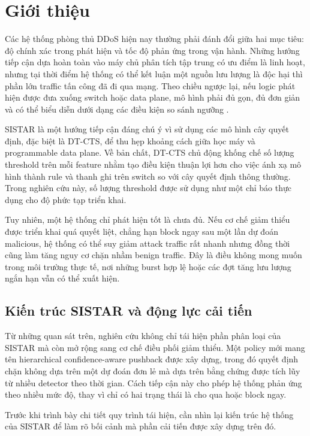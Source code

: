 \section{Giới thiệu}

Các hệ thống phòng thủ DDoS hiện nay thường phải đánh đổi giữa hai mục tiêu: độ chính xác trong phát hiện và tốc độ phản ứng trong vận hành. Những hướng tiếp cận dựa hoàn toàn vào máy chủ phân tích tập trung có ưu điểm là linh hoạt, nhưng tại thời điểm hệ thống có thể kết luận một nguồn lưu lượng là độc hại thì phần lớn traffic tấn công đã đi qua mạng. Theo chiều ngược lại, nếu logic phát hiện được đưa xuống switch hoặc data plane, mô hình phải đủ gọn, đủ đơn giản và có thể biểu diễn dưới dạng các điều kiện so sánh ngưỡng \cite{bosshart2014p4,breiman2001random}.

SISTAR là một hướng tiếp cận đáng chú ý vì sử dụng các mô hình cây quyết định, đặc biệt là DT-CTS, để thu hẹp khoảng cách giữa học máy và programmable data plane. Về bản chất, DT-CTS chủ động khống chế số lượng threshold trên mỗi feature nhằm tạo điều kiện thuận lợi hơn cho việc ánh xạ mô hình thành rule và thanh ghi trên switch so với cây quyết định thông thường. Trong nghiên cứu này, số lượng threshold được sử dụng như một chỉ báo thực dụng cho độ phức tạp triển khai.

Tuy nhiên, một hệ thống chỉ phát hiện tốt là chưa đủ. Nếu cơ chế giảm thiểu được triển khai quá quyết liệt, chẳng hạn block ngay sau một lần dự đoán malicious, hệ thống có thể suy giảm attack traffic rất nhanh nhưng đồng thời cũng làm tăng nguy cơ chặn nhầm benign traffic. Đây là điều không mong muốn trong môi trường thực tế, nơi những burst hợp lệ hoặc các đợt tăng lưu lượng ngắn hạn vẫn có thể xuất hiện.

\subsection{Kiến trúc SISTAR và động lực cải tiến}

Từ những quan sát trên, nghiên cứu không chỉ tái hiện phần phân loại của SISTAR mà còn mở rộng sang cơ chế điều phối giảm thiểu. Một policy mới mang tên hierarchical confidence-aware pushback được xây dựng, trong đó quyết định chặn không dựa trên một dự đoán đơn lẻ mà dựa trên bằng chứng được tích lũy từ nhiều detector theo thời gian. Cách tiếp cận này cho phép hệ thống phản ứng theo nhiều mức độ, thay vì chỉ có hai trạng thái là cho qua hoặc block ngay.

Trước khi trình bày chi tiết quy trình tái hiện, cần nhìn lại kiến trúc hệ thống của SISTAR để làm rõ bối cảnh mà phần cải tiến được xây dựng trên đó.

